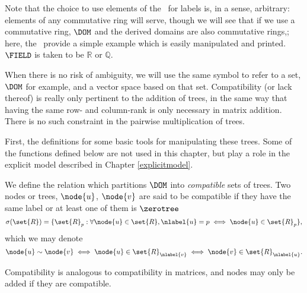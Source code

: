 

Note that the choice to use elements of the \polytypes\ for labels is, in a
sense, arbitrary: elements of any commutative ring will serve, though
we will see that if we use a commutative ring, $\DOM$ and the derived
domains are also commutative rings,; here, the \polytypes\ provide a
simple example which is easily manipulated and printed. 
$\FIELD$ is taken to be $\mathbb{R}$ or $\mathbb{Q}$.

When there is no risk of ambiguity, we will use the same symbol to
refer to a set, $\DOM$ for example, and a vector space based on that
set. Compatibility (or lack thereof) is really only pertinent to the
addition of trees, in the same way that having the same row- and
column-rank is only necessary in matrix addition.  There is no such
constraint in the pairwise multiplication of trees.


First, the definitions for some basic tools for manipulating these
trees. Some of the functions defined below are not used in this chapter, but
play a role in the explicit model described in Chapter \ref{explicitmodel}.

\begin{definition}
  We define the relation which partitions $\DOM$ into
  \emph{compatible} sets of trees. Two nodes or trees, $\node{u}$, $\node{v}$
  are said to be compatible if they have the same label or at least
  one of them is $\zerotree$
  \[
  \sigma(\set{R}) = \{\set{R}_p: \forall \node{u} \in \set{R}, \nlabel{u} = p \iff \node{u} \in \set{R}_p\},
  \]
  which we may denote
  \[
  \node{u} \sim \node{v} \iff  
  \node{u}\in\set{R}_{\nlabel{v}} \iff 
  \node{v}\in\set{R}_{\nlabel{u}}.
  \]
  
  Compatibility is analogous to compatibility in matrices, and nodes
  may only be added if they are compatible.
\end{definition}

